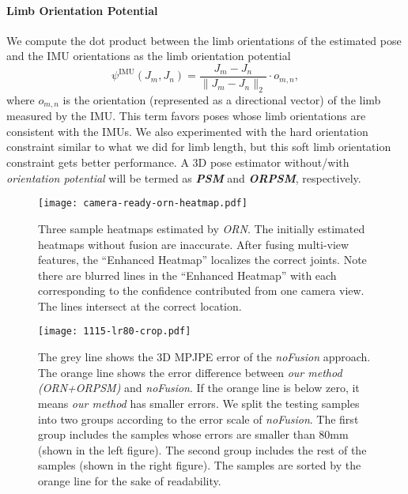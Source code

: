 \documentclass[10pt,twocolumn,letterpaper]{article}
\begin{document}
\paragraph{Limb Orientation Potential}
We compute the dot product between the limb orientations of the estimated pose and the IMU orientations as the limb orientation potential
\begin{equation}
    \psi^{\text{IMU}}({J}_m, {J}_n)= \frac{{J}_m-{J}_n}{\|{J}_m-{J}_n\|_2} \cdot {o}_{m,n},
\end{equation}
where $o_{m,n}$ is the orientation (represented as a directional vector) of the limb measured by the IMU. This term favors poses whose limb orientations are consistent with the IMUs. We also experimented with the hard orientation constraint similar to what we did for limb length, but this soft limb orientation constraint gets better performance. A $3$D pose estimator without/with \emph{orientation potential} will be termed as \textbf{\emph{PSM}} and \textbf{\emph{ORPSM}}, respectively.


\begin{figure}[ht]
\centering
\texttt{[image: camera-ready-orn-heatmap.pdf]}
\caption{Three sample heatmaps estimated by \emph{ORN}. The initially estimated heatmaps without fusion are inaccurate. After fusing multi-view features, the ``Enhanced Heatmap'' localizes the correct joints. Note there are blurred lines in the ``Enhanced Heatmap'' with each corresponding to the confidence contributed from one camera view. The lines intersect at the correct location.}
\label{fig:visualization_hm}
\end{figure}


\begin{figure*}[htbp]
\centering
\texttt{[image: 1115-lr80-crop.pdf]}
\caption{The grey line shows the $3$D MPJPE error of the \emph{noFusion} approach. The orange line shows the error difference between \emph{our method (ORN+ORPSM)} and \emph{noFusion}. If the orange line is below zero, it means \emph{our method} has smaller errors. We split the testing samples into two groups according to the error scale of \emph{noFusion}. The first group includes the samples whose errors are smaller than $80$mm (shown in the left figure). The second group includes the rest of the samples (shown in the right figure). The samples are sorted by the orange line for the sake of readability.}
\label{fig:ifusion-vs-nofusion}
\end{figure*}
\end{document}
